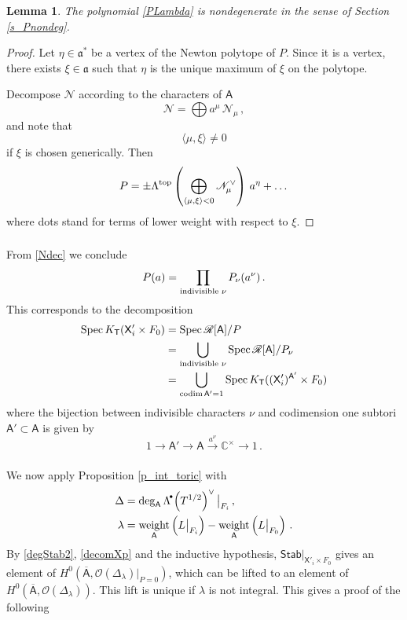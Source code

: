 \documentclass[14pt]{extarticle}
\newcommand{\Ct}{\mathbb{C}^\times}
\newcommand{\bT}{\mathsf{T}}
\newcommand{\bA}{\mathsf{A}}
\newcommand{\bX}{\mathsf{X}}
\newcommand{\cR}{\mathscr{R}}
\newcommand{\cN}{\mathscr{N}}
\newcommand{\bbA}{\overline{\bA}}
\newcommand{\cO}{\mathscr{O}}
\newcommand{\fa}{\mathfrak{a}}
\newcommand{\Stab}{\mathsf{Stab}}
\DeclareMathOperator{\Spec}{Spec}
\DeclareMathOperator{\codim}{codim}
\DeclareMathOperator{\weight}{weight}
\newcommand{\Ld}{{\Lambda}^{\!\raisebox{0.5mm}{$\scriptscriptstyle
      \bullet$}}\!}
\newtheorem{Lemma}{Lemma}[section]
\theoremstyle{definition}
\begin{document}
  \begin{Lemma}
  The polynomial \eqref{PLambda} is nondegenerate in the sense of
  Section \ref{s_Pnondeg}. 
\end{Lemma}

\begin{proof}
Let $\eta\in \fa^*$ be a vertex of the Newton polytope of $P$. Since
it is a vertex, there exists $\xi \in \fa$ such that $\eta$ is the
unique maximum of $\xi$ on the polytope.

Decompose $\cN$ according to the characters of $\bA$ 
%
\begin{equation}
\cN= \bigoplus a^\mu \, \cN_\mu \,, \label{Ndec}
\end{equation}
%
and note that
$$
\langle \mu, \xi \rangle \ne 0
$$
if $\xi$ is chosen generically.  Then 
$$
P = \pm \Lambda^{\textup{top}} \left( \bigoplus_{\langle \mu, \xi
    \rangle < 0} \cN^\vee_\mu \right) \, a^\eta + \dots
$$
where dots stand for terms of lower weight with respect to $\xi$. 
\end{proof}

\subsubsection{}
{} From \eqref{Ndec} we conclude
$$
P(a) = \prod_{\textup{indivisible $\nu$}} P_\nu(a^\nu) \,.
$$
This corresponds to the decomposition
%
\begin{align}
  \Spec K_\bT(\bX'_i \times F_0) &= \Spec \cR[\bA]/P  \notag \\
                                   & = \bigcup_{\textup{indivisible $\nu$}}
                                     \Spec \cR[\bA]/P_\nu \notag \\
  &= \bigcup_{\codim \bA'=1}  \Spec
  K_\bT((\bX'_i)^{\bA'} \times F_0)\label{decomXp}
  \end{align}
  where the bijection between indivisible characters $\nu$ and
  codimension one subtori $\bA' \subset \bA$ is given by
  $$
  1 \to \bA' \to \bA \xrightarrow{a^\nu} \Ct \to 1 \,.
  $$

\subsubsection{}
We now apply Proposition \ref{p_int_toric} with 
%
\begin{align*}
  \Delta & = \deg_\bA \Ld  \left(T^{1/2}\right)^\vee \big|_{F_i} \,, \\
  \lambda &= 
\weight_\bA\left(L\big|_{F_i}\right) - 
\weight_\bA\left(L\big|_{F_0}\right) \,. 
\end{align*}
%
By \eqref{degStab2}, \eqref{decomXp} and the inductive hypothesis, $\Stab\big|_{\bX'_i
  \times F_0}$ gives an element of $H^0(\bbA,
\cO(\Delta_\lambda)\big|_{P=0})$,
which can be lifted to an element of $H^0(\bbA,
\cO(\Delta_\lambda))$. This lift is unique if $\lambda$ is
not integral. This gives a proof of the following
\end{document}
